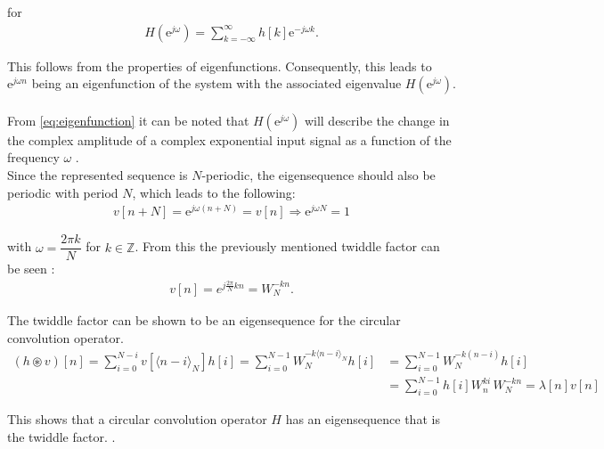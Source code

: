 for
\begin{align*}
H(\text{e}^{j\omega}) = \sum_{k=-\infty}^{\infty} h[k]\text{e}^{-j\omega k}.
\end{align*}

This follows from the properties of eigenfunctions. Consequently, this leads to $\text{e}^{j\omega n}$ being an eigenfunction of the system with the associated eigenvalue $H(\text{e}^{j\omega})$.
\\\\
From \eqref{eq:eigenfunction} it can be noted that $H(\text{e}^{j\omega})$ will describe the change in the complex amplitude of a complex exponential input signal as a function of the frequency $\omega$ \cite{DTSP}. 
\\
Since the represented sequence is $N$-periodic, the eigensequence should also be periodic with period $N$, which leads to the following:
\begin{align*}
v[n+N] = \text{e}^{j\omega (n+N)} = v[n] \Rightarrow \text{e}^{j\omega N} = 1
\end{align*}

with $\omega = \dfrac{2 \pi k}{N}$ for $k \in \mathbb{Z}$. From this the previously mentioned twiddle factor can be seen \cite{FSP}:
\begin{align*}
v[n] = e^{j\frac{2\pi}{N} kn} = W_N^{-kn}.
\end{align*}

The twiddle factor can be shown to be an eigensequence for the circular convolution operator.
\begin{align*}
	(h\circledast v)[n] 
	= \sum_{i=0}^{N-i} v[\langle n-i \rangle_N ]h[i] 
	= \sum_{i=0}^{N-1} W_N^{-k\langle n-i\rangle_N}h[i]
	&= \sum_{i=0}^{N-1} W_N^{-k(n-i)}h[i]\\
	&= \sum_{i=0}^{N-1} h[i] W_n^{ki} \, W_N^{-kn}
	= \lambda[n] v[n]
\end{align*}

This shows that a circular convolution operator $H$ has an eigensequence that is the twiddle factor. .